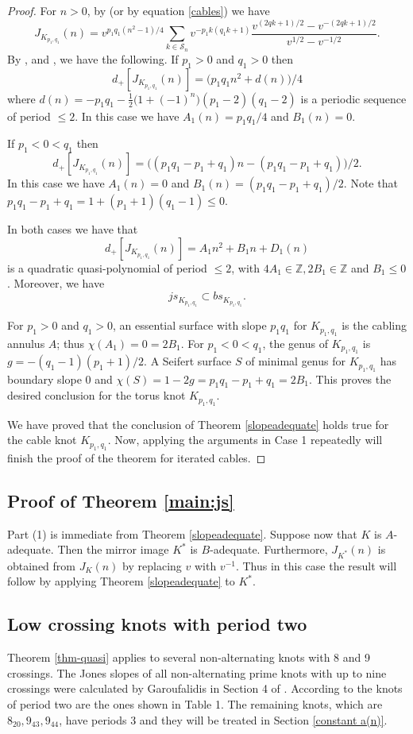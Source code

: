 \documentclass[11pt]{amsart}
\theoremstyle{definition}
\def\BZ{\mathbb Z}
\def\CS{\mathcal S}
\begin{document}
\begin{proof}
 For $n>0$, by \cite{Mo} (or by equation \eqref{cables}) we have
$$J_{K_{p_1,q_1}}(n)= v^{p_1q_1(n^2-1)/4} \sum_{k \in \CS_n} v^{-p_1k(q_1k+1)} \frac{v^{(2qk+1)/2}-v^{-(2qk+1)/2}}{v^{1/2}-v^{-1/2}}.$$
By \cite[Section 4.8]{Ga-slope}, \cite[Lemma 1.4]{Tr-strongAJ} and \cite[Lemma 2.1]{RZ}, we have the following. If $p_1>0$ and $q_1>0$ then
$$d_+[J_{K_{p_1,q_1}}(n)]= \big( p_1q_1n^2+d(n) \big)/4$$
where $d(n)=-p_1q_1-\frac{1}{2} \big( 1+(-1)^{n}\big)(p_1-2)(q_1-2)$ is a periodic sequence of period $\le 2$. In this case we have $A_1(n) = p_1q_1/4$ and $B_1(n) = 0$.

If $p_1<0<q_1$ then 
$$d_+[J_{K_{p_1,q_1}}(n)]= \big( (p_1q_1-p_1+q_1)n-(p_1q_1-p_1+q_1) \big)/2.$$
In this case we have $A_1(n) = 0$ and $B_1(n) = (p_1q_1-p_1+q_1)/2$. Note that $p_1q_1-p_1+q_1=1+(p_1+1)(q_1-1) \le 0$. 


In both cases we have that $$
d_+[J_{K_{p_1,q_1}}(n)]=A_1n^2+B_1n+D_1(n)
$$
is a quadratic quasi-polynomial of period $\le 2$, with $4A_1 \in \BZ, 2B_1 \in \BZ$ and $B_1 \le 0$. Moreover, we have $$js_{K_{p_1,q_1}} \subset bs_{K_{p_1,q_1}}.$$

For $p_1>0$ and $q_1 >0$, an essential surface with slope $p_1q_1$ for $K_{p_1,q_1}$ is the cabling annulus $A$; thus $\chi(A_1)=0=2B_1$.
For $p_1<0<q_1$, the genus of $K_{p_1,q_1}$ is $g= -(q_1-1)(p_1+1)/2$.
A Seifert surface $S$ of minimal genus for $K_{p_1,q_1}$ has boundary slope $0$ and 
$\chi(S)=1-2g=p_1q_1-p_1+q_1=2B_1$. This proves the desired conclusion for the torus knot $K_{p_1,q_1}$.

We have proved that the conclusion of Theorem \ref{slopeadequate} holds true for the cable knot $K_{p_1,q_1}$. Now, applying the arguments in Case 1 repeatedly will finish the proof of the theorem for iterated cables.
\end{proof}



 \subsection{ Proof of Theorem \ref{main:js}}   Part (1) is immediate from Theorem \ref{slopeadequate}.
Suppose now that $K$ is $A$-adequate. Then the mirror image $K^{*}$ is $B$-adequate.
Furthermore, $J_{K^{*}}(n)$ is obtained from $J_{K}(n)$ by replacing $v$ with $v^{-1}$. Thus in this case the result will follow
by applying  Theorem \ref{slopeadequate} to $K^{*}$.
\smallskip



\subsection{Low crossing knots with period two}
Theorem \ref{thm-quasi} applies to several non-alternating knots with 8 and 9 crossings.  The Jones slopes of all non-alternating prime knots with up to nine crossings were calculated by Garoufalidis in Section 4 of \cite{Ga-slope}.
According to \cite{Ga-slope} the knots of 
 period two are the ones shown in Table 1. 
The remaining knots, which are $8_{20}, 9_{43}, 9_{44}$, have periods 3 and they will be treated in Section \ref{constant a(n)}.
\end{document}
